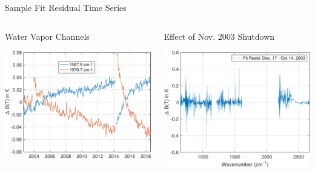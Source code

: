 \documentclass[10pt,t]{beamer}
\begin{document}
\begin{frame}[label={sec:org7365180}]{Sample Fit Residual Time Series}
\vspace{-0.35in}
\begin{columns}
\begin{column}{0.5\columnwidth}
\begin{block}{\footnotesize Water Vapor Channels}
\vspace{-0.1in}
\begin{center}
\includegraphics[width=0.85\linewidth]{./Figs/Pdf/resid_1567_and_1570_cm01_dnu.pdf}
\end{center}
\end{block}
\end{column}

\begin{column}{0.5\columnwidth}
\begin{block}{\footnotesize Effect of Nov. 2003 Shutdown}
\vspace{-0.1in}
\begin{center}
\includegraphics[width=0.85\linewidth]{./Figs/Pdf/resid_spectrum_dec17_minus_oct14_2003.pdf}
\end{center}
\end{block}
\end{column}
\end{columns}


\end{frame}
\end{document}
